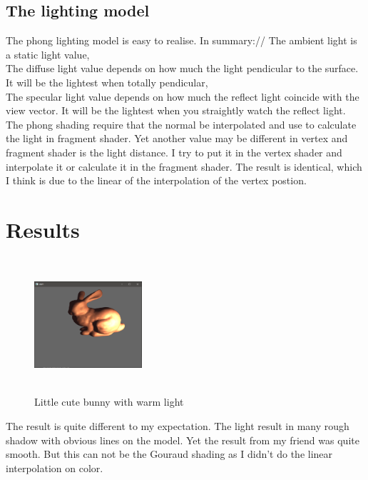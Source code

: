 \documentclass[acmtog]{acmart}
\begin{document}
    \subsection{The lighting model}
    The phong lighting model is easy to realise. In summary://
    The ambient light is a static light value,\\
    The diffuse light value depends on how much the light pendicular to the surface. It will be the lightest when totally pendicular,\\
    The specular light value depends on how much the reflect light coincide with the view vector. It will be the lightest when you straightly watch the reflect light.
    The phong shading require that the normal be interpolated and use to calculate the light in fragment shader. Yet another value may be different in vertex and fragment shader is the light distance. I try to put it in the vertex shader and interpolate it or calculate it in the fragment shader. The result is identical, which I think is due to the linear of the interpolation of the vertex postion.
\section{Results}

\begin{figure}[h]
\centering
\includegraphics[width=4cm,height=5cm]{bunny.png}
\caption{Little cute bunny with warm light}
\end{figure}
The result is quite different to my expectation. The light result in many rough shadow with obvious lines on the model. Yet the result from my friend was quite smooth. But this can not be the Gouraud shading as I didn't do the linear interpolation on color. 
\end{document}
